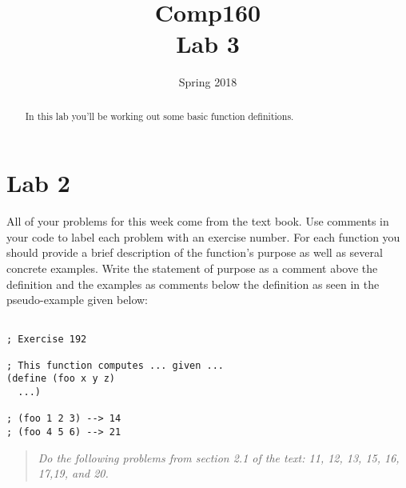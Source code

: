 \documentclass[nobib]{tufte-handout}
\title{Comp160 \\ Lab 3 }
\author{}
\date{ Spring 2018 }
\begin{document}
\maketitle

\begin{abstract}
In this lab you'll be working out some basic function definitions.
\end{abstract}

\section{Lab 2}

All of your problems for this week come from the text book. Use comments in your code to label each problem with an exercise number. For each function you should provide a brief description of the function's purpose as well as several concrete examples. Write the statement of purpose as a comment above the definition and the examples as comments below the definition as seen in the pseudo-example given below:

\begin{lstlisting}

; Exercise 192

; This function computes ... given ...
(define (foo x y z)
  ...)

; (foo 1 2 3) --> 14
; (foo 4 5 6) --> 21
\end{lstlisting}

\vspace{1in}

\begin{quote}
  \textit{
Do the following problems from section 2.1 of the text: 11, 12, 13, 15, 16, 17,19, and 20.
}
\end{quote}
\end{document}

